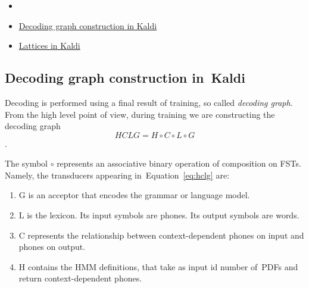\subsubsection*{} %

\begin{itemize}
    \item {}
    \item \href{http://kaldi.sourceforge.net/graph.html} {Decoding graph construction in Kaldi}
    \item \href{http://kaldi.sourceforge.net/lattices.html} {Lattices in Kaldi}
\end{itemize}

\subsection{Decoding graph construction in~Kaldi} %

Decoding is performed using a final result of training, so called {\it decoding graph}. 
From the high level point of view,
during training we are constructing the decoding graph 
\begin{equation} \label{eq:hclg}
HCLG = H\circ C\circ L\circ G
\end{equation}.

The symbol $\circ$ represents an associative binary operation of composition on \acp{FST}.
Namely, the transducers appearing in~Equation~\ref{eq:hclg} are:
\begin{enumerate}
    \item G is an acceptor that encodes the grammar or language model.
    \item L is the lexicon. Its input symbols are phones. Its output symbols are words.
    \item C represents the relationship between context-dependent phones on input and phones on output.
    \item H contains the \ac{HMM} definitions, that take as input id number of~\acp{PDF} and return context-dependent phones.
\end{enumerate}

